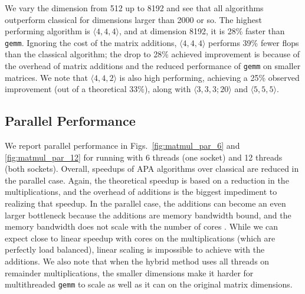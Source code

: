 \documentclass[manuscript]{acmart}
\newcommand{\dims}[1]{\langle #1 \rangle}
\begin{document}
We vary the dimension from 512 up to 8192 and see that all algorithms outperform classical for dimensions larger than 2000 or so.
The highest performing algorithm is $\dims{4,4,4}$, and at dimension 8192, it is 28\% faster than \texttt{gemm}.
Ignoring the cost of the matrix additions, $\dims{4,4,4}$ performs 39\% fewer flops than the classical algorithm; the drop to 28\% achieved improvement is because of the overhead of matrix additions and the reduced performance of \texttt{gemm} on smaller matrices.
We note that $\dims{4,4,2}$ is also high performing, achieving a 25\% observed improvement (out of a theoretical 33\%), along with $\dims{3,3,3;20}$ and $\dims{5,5,5}$.

\subsection{Parallel Performance}
\label{sec:matmul_perf_par}

We report parallel performance in Figs.~\ref{fig:matmul_par_6} and \ref{fig:matmul_par_12} for running with 6 threads (one socket) and 12 threads (both sockets).
Overall, speedups of APA algorithms over classical are reduced in the parallel case.
Again, the theoretical speedup is based on a reduction in the multiplications, and the overhead of additions is the biggest impediment to realizing that speedup.
In the parallel case, the additions can become an even larger bottleneck because the additions are memory bandwidth bound, and the memory bandwidth does not scale with the number of cores \cite{BB15}.
While we can expect close to linear speedup with cores on the multiplications (which are perfectly load balanced), linear scaling is impossible to achieve with the additions.
We also note that when the hybrid method uses all threads on remainder multiplications, the smaller dimensions make it harder for multithreaded \texttt{gemm} to scale as well as it can on the original matrix dimensions.
\end{document}
